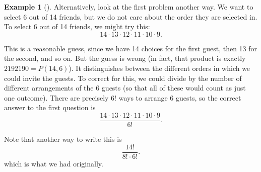 \documentclass[10pt,]{book}
\theoremstyle{plain}
\theoremstyle{definition}
\newtheorem{example}[theorem]{Example}
\theoremstyle{definition}
\theoremstyle{definition}
\numberwithin{equation}{section}
\begin{document}
\begin{example}[]
              Alternatively, look at the first problem another way. We want to select 6 out of 14 friends, but we do not care about the order they are selected in. To select 6 out of 14 friends, we might try this:
              \begin{equation*}
                14 \cdot 13 \cdot 12 \cdot 11 \cdot 10 \cdot 9.
              \end{equation*}
\par

              This is a reasonable guess, since we have 14 choices for the first guest, then 13 for the second, and so on. But the guess is wrong (in fact, that product is exactly \(2192190 = P(14,6)\)). It distinguishes between the different orders in which we could invite the guests. To correct for this, we could divide by the number of different arrangements of the 6 guests (so that all of these would count as just one outcome). There are precisely \(6!\) ways to arrange 6 guests, so the correct answer to the first question is
              \begin{equation*}
                \frac{14 \cdot 13 \cdot 12 \cdot 11\cdot 10 \cdot 9}{6!}.
              \end{equation*}
\par

              Note that another way to write this is
              \begin{equation*}
                \frac{14!}{8!\cdot 6!}.
              \end{equation*}
              which is what we had originally.
\end{example}
\typeout{************************************************}
\typeout{************************************************}
\end{document}
